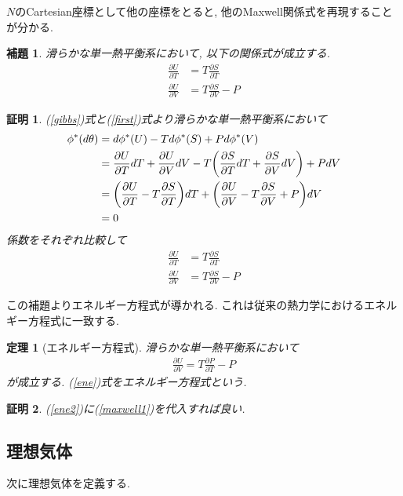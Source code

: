 \documentclass[a4paper,12pt]{ltjsarticle}
\theoremstyle{break}
\newtheorem{thrm}[thm]{定理}
\newtheorem{lem}[thm]{補題}
\newtheorem*{prf}{証明}
\newcommand{\ddel}[2]{\frac{\partial{#1}}{\partial{#2}}}
\numberwithin{equation}{section}
\begin{document}
$N$のCartesian座標として他の座標をとると, 他のMaxwell関係式を再現することが分かる. 

\begin{lem}
  滑らかな単一熱平衡系において, 以下の関係式が成立する. 
  \begin{align}
    \label{ene1}
    \ddel{U}{T} &= T \ddel{S}{T} \\
    \label{ene2}
    \ddel{U}{V} &= T\ddel{S}{V} - P 
  \end{align}
\end{lem}  

\begin{prf}
  (\ref{gibbs})式と(\ref{first})式より滑らかな単一熱平衡系において
  \begin{align*}
    \phi^*(d\theta) 
    &= d\phi^*(U) - Td\phi^*(S) + Pd\phi^*(V) \\
    &= \ddel{U}{T}dT + \ddel{U}{V}dV -T \qty(\ddel{S}{T}dT + \ddel{S}{V}dV) + PdV \\
    &= \qty(\ddel{U}{T} - T\ddel{S}{T})dT + \qty(\ddel{U}{V} - T\ddel{S}{V} + P)dV \\
    &= 0
  \end{align*}
  係数をそれぞれ比較して
  \begin{align*}
    \ddel{U}{T} &= T \ddel{S}{T} \\
    \ddel{U}{V} &= T\ddel{S}{V} - P 
  \end{align*}
\end{prf}

この補題よりエネルギー方程式が導かれる. 
これは従来の熱力学におけるエネルギー方程式に一致する. 

\begin{thrm}[エネルギー方程式]
  滑らかな単一熱平衡系において
  \begin{align}
    \label{ene}
    \ddel{U}{V} = T\ddel{P}{T} - P
  \end{align}
  が成立する. 
  (\ref{ene})式をエネルギー方程式という. 
\end{thrm}  

\begin{prf}
  (\ref{ene2})に(\ref{maxwell1})を代入すれば良い. 
\end{prf}

\subsection{理想気体}

次に理想気体を定義する.  
\end{document}
